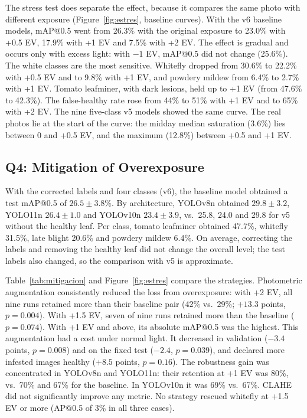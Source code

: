 \documentclass[sensors,article,submit,pdftex,moreauthors]{Definitions/mdpi}
\begin{document}
{\color{blue} The stress test does separate the effect, because it compares the same photo with different exposure (Figure~\ref{fig:estres}, baseline curves).} {\color{blue} With the v6 baseline models, mAP@0.5 went from 26.3\% with the original exposure to 23.0\% with +0.5 EV, 17.9\% with +1 EV and 7.5\% with +2 EV.} {\color{blue} The effect is gradual and occurs only with excess light: with $-1$ EV, mAP@0.5 did not change (25.6\%).} {\color{blue} The white classes are the most sensitive.} {\color{blue} Whitefly dropped from 30.6\% to 22.2\% with +0.5 EV and to 9.8\% with +1 EV, and powdery mildew from 6.4\% to 2.7\% with +1 EV.} {\color{blue} Tomato leafminer, with dark lesions, held up to +1 EV (from 47.6\% to 42.3\%).} {\color{blue} The false-healthy rate rose from 44\% to 51\% with +1 EV and to 65\% with +2 EV.} {\color{blue} The nine five-class v5 models showed the same curve.} {\color{blue} The real photos lie at the start of the curve: the midday median saturation (3.6\%) lies between 0 and +0.5 EV, and the maximum (12.8\%) between +0.5 and +1 EV.}

\subsection{\color{blue} Q4: Mitigation of Overexposure}

{\color{blue} With the corrected labels and four classes (v6), the baseline model obtained a test mAP@0.5 of $26.5 \pm 3.8\%$.} {\color{blue} By architecture, YOLOv8n obtained $29.8 \pm 3.2$, YOLO11n $26.4 \pm 1.0$ and YOLOv10n $23.4 \pm 3.9$, vs.\ 25.8, 24.0 and 29.8 for v5 without the healthy leaf.} {\color{blue} Per class, tomato leafminer obtained 47.7\%, whitefly 31.5\%, late blight 20.6\% and powdery mildew 6.4\%.} {\color{blue} On average, correcting the labels and removing the healthy leaf did not change the overall level; the test labels also changed, so the comparison with v5 is approximate.}

{\color{blue} Table~\ref{tab:mitigacion} and Figure~\ref{fig:estres} compare the strategies.} {\color{blue} Photometric augmentation consistently reduced the loss from overexposure: with +2 EV, all nine runs retained more than their baseline pair (42\% vs.\ 29\%;} {\color{blue} $+13.3$ points, $p = 0.004$).} {\color{blue} With +1.5 EV, seven of nine runs retained more than the baseline ($p = 0.074$).} {\color{blue} With +1 EV and above, its absolute mAP@0.5 was the highest.} {\color{blue} This augmentation had a cost under normal light.} {\color{blue} It decreased in validation ($-3.4$ points, $p = 0.008$) and on the fixed test ($-2.4$, $p = 0.039$), and declared more infested images healthy ($+8.5$ points, $p = 0.16$).} {\color{blue} The robustness gain was concentrated in YOLOv8n and YOLO11n: their retention at +1 EV was 80\%, vs.\ 70\% and 67\% for the baseline.} {\color{blue} In YOLOv10n it was 69\% vs.\ 67\%.} {\color{blue} CLAHE did not significantly improve any metric.} {\color{blue} No strategy rescued whitefly at +1.5 EV or more (AP@0.5 of 3\% in all three cases).}
\end{document}
